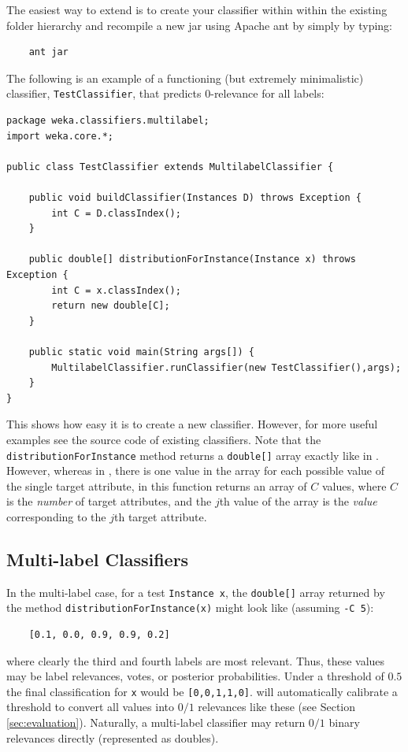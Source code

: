\documentclass[11pt]{article}
\newcommand{\MEKA}{Meka}
\newcommand{\WEKA}{Weka}
\begin{document}
The easiest way to extend \framework{\MEKA} is to create your classifier within within the existing \framework{\MEKA} folder hierarchy and recompile a new jar using Apache ant by simply by typing:
\begin{verbatim}
	ant jar
\end{verbatim}

The following is an example of a functioning (but extremely minimalistic) classifier, \texttt{TestClassifier}, that predicts $0$-relevance for all labels:

{\small
\begin{verbatim}
package weka.classifiers.multilabel;
import weka.core.*;

public class TestClassifier extends MultilabelClassifier {
	
    public void buildClassifier(Instances D) throws Exception {
        int C = D.classIndex();
    }
    
    public double[] distributionForInstance(Instance x) throws Exception {
        int C = x.classIndex();
       	return new double[C];
    }
    
    public static void main(String args[]) {
        MultilabelClassifier.runClassifier(new TestClassifier(),args);
    }
}
\end{verbatim}
}

This shows how easy it is to create a new classifier. However, for more useful examples see the source code of existing \framework{\MEKA} classifiers. Note that the \texttt{distributionForInstance} method returns a \texttt{double[]} array exactly like in \framework{\WEKA}. However, whereas in \framework{\WEKA}, there is one value in the array for each possible value of the single target attribute, in \framework{\MEKA} this function returns an array of $C$ values, where $C$ is the \emph{number} of target attributes, and the $j$th value of the array is the \emph{value} corresponding to the $j$th target attribute.

\subsection{Multi-label Classifiers}

In the multi-label case, for a test \texttt{Instance x}, the \texttt{double[]} array returned by the method \texttt{distributionForInstance(x)} might look like (assuming \texttt{-C 5}):
\begin{verbatim}
	[0.1, 0.0, 0.9, 0.9, 0.2]
\end{verbatim} 
where clearly the third and fourth labels are most relevant. Thus, these values may be label relevances, votes, or posterior probabilities. Under a threshold of $0.5$ the final classification for \texttt{x} would be \texttt{[0,0,1,1,0]}. \framework{\MEKA} will {\blue automatically calibrate a threshold} to convert all values into $0/1$ relevances like these (see Section \ref{sec:evaluation}). Naturally, a multi-label classifier may return $0/1$ binary relevances directly (represented as doubles).
\end{document}
